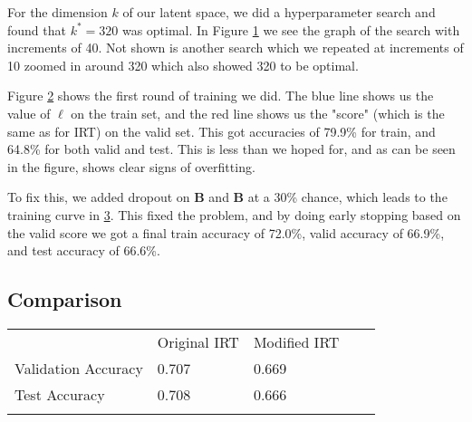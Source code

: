 \documentclass[twocolumn]{article}
\begin{document}
\begin{figure}[!ht]
    \centering
    
    \label{fig:kstar}
\end{figure}

For the dimension $k$ of our latent space, we did a hyperparameter search and
found that $k^* = 320$ was optimal. In Figure \ref{fig:kstar} we see the graph
of the search with increments of 40. Not shown is another search which we
repeated at increments of 10 zoomed in around 320 which also showed 320 to be
optimal.

\begin{figure}[!ht]
    \centering
    
    \label{fig:predropout}
\end{figure}

Figure \ref{fig:predropout} shows the first round of training we did. The blue
line shows us the value of $\ell$ on the train set, and the red line shows us
the "score" (which is the same as for IRT) on the valid set. This got
accuracies of 79.9\% for train, and 64.8\% for both valid and test. This is
less than we hoped for, and as can be seen in the figure, shows clear signs of
overfitting.

\begin{figure}[!ht]
    \centering
    
    \label{fig:withdropout}
\end{figure}

To fix this, we added dropout on $\mathbf{B}$ and $\mathbf{B}$ at a 30\%
chance, which leads to the training curve in \ref{fig:withdropout}. This fixed
the problem, and by doing early stopping based on the valid score we got a
final train accuracy of 72.0\%, valid accuracy of 66.9\%, and test accuracy of
66.6\%.

\subsection{Comparison}

\item

\begin{mcfigure}
    \begin{tabular}{lllll}
                            & Original IRT & Modified IRT \\
        Validation Accuracy & 0.707 & 0.669\\
        Test Accuracy & 0.708 & 0.666\\
        & &  &  
    \end{tabular}
\end{mcfigure}
\end{document}
